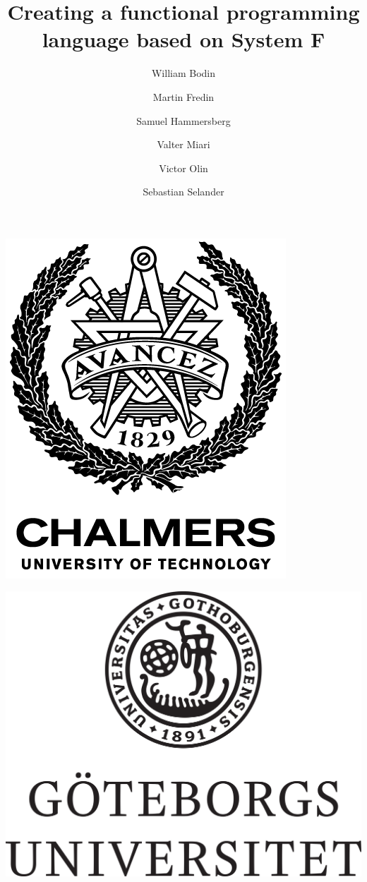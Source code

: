 \documentclass[12pt,a4paper]{article}
\title{Creating a functional programming language based on System F}
\author{William Bodin\and Martin Fredin\and Samuel Hammersberg\and Valter Miari\and Victor Olin\and Sebastian Selander}
\date{}
\begin{document}
\maketitle

\begin{center}
    \includegraphics[scale=0.3]{tjolmers.png}
    
    \includegraphics[scale=1.5]{golleborg.png}
\end{center}
\end{document}
